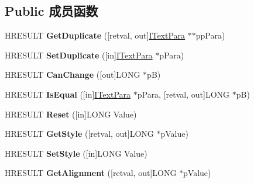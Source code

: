 \subsection*{Public 成员函数}
\begin{DoxyCompactItemize}
\item 
\mbox{\label{interface_i_text_para_a071c93c4b194c2719c9619700ca25951}} 
H\+R\+E\+S\+U\+LT {\bfseries Get\+Duplicate} (\mbox{[}retval, out\mbox{]}\hyperlink{interface_i_text_para}{I\+Text\+Para} $\ast$$\ast$pp\+Para)
\item 
\mbox{\label{interface_i_text_para_af3271ad4ec8878411e5dfc37a7064abe}} 
H\+R\+E\+S\+U\+LT {\bfseries Set\+Duplicate} (\mbox{[}in\mbox{]}\hyperlink{interface_i_text_para}{I\+Text\+Para} $\ast$p\+Para)
\item 
\mbox{\label{interface_i_text_para_a2824ea3b8122463b97c5413534fcd097}} 
H\+R\+E\+S\+U\+LT {\bfseries Can\+Change} (\mbox{[}out\mbox{]}L\+O\+NG $\ast$pB)
\item 
\mbox{\label{interface_i_text_para_ae49dd71b9f4b59c03613903df78174d6}} 
H\+R\+E\+S\+U\+LT {\bfseries Is\+Equal} (\mbox{[}in\mbox{]}\hyperlink{interface_i_text_para}{I\+Text\+Para} $\ast$p\+Para, \mbox{[}retval, out\mbox{]}L\+O\+NG $\ast$pB)
\item 
\mbox{\label{interface_i_text_para_affdfaf5a8d2c4136c36bd1288dca2817}} 
H\+R\+E\+S\+U\+LT {\bfseries Reset} (\mbox{[}in\mbox{]}L\+O\+NG Value)
\item 
\mbox{\label{interface_i_text_para_a88132416c9aa55e3738f7e5f31fa35b0}} 
H\+R\+E\+S\+U\+LT {\bfseries Get\+Style} (\mbox{[}retval, out\mbox{]}L\+O\+NG $\ast$p\+Value)
\item 
\mbox{\label{interface_i_text_para_a1b2e266a8d056759459b7f63dafb5ce4}} 
H\+R\+E\+S\+U\+LT {\bfseries Set\+Style} (\mbox{[}in\mbox{]}L\+O\+NG Value)
\item 
\mbox{\label{interface_i_text_para_a4964553fce4e7052b8ee14c506ee56ec}} 
H\+R\+E\+S\+U\+LT {\bfseries Get\+Alignment} (\mbox{[}retval, out\mbox{]}L\+O\+NG $\ast$p\+Value)
$$
\end{DoxyCompactItemize}
